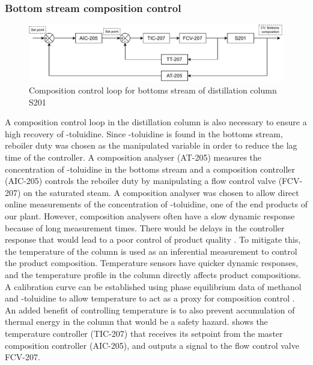 \subsubsection{Bottom stream composition control} %
\begin{figure}
    \centering
    \includegraphics[width=\linewidth]{chapters/4-operation-control/4-Figures/S201-CC.pdf}
    \caption{Composition control loop for bottoms stream of distillation column S201}
    \label{fig:S201-CC}
\end{figure}
A composition control loop in the distillation column is also necessary to ensure a high recovery of \ortho-toluidine. Since \ortho-toluidine is found in the bottoms stream, reboiler duty was chosen as the manipulated variable in order to reduce the lag time of the controller. A composition analyser (AT-205) measures the concentration of \ortho-toluidine in the bottoms stream and a composition controller (AIC-205) controls the reboiler duty by manipulating a flow control valve (FCV-207) on the saturated steam. 
A composition analyser was chosen to allow direct online measurements of the concentration of \ortho-toluidine, one of the end products of our plant. However, composition analysers often have a slow dynamic response because of long measurement times. There would be delays in the controller response that would lead to a poor control of product quality \cite{kister_distillation_1990}. To mitigate this, the temperature of the column is used as an inferential measurement to control the product composition. Temperature sensors have quicker dynamic responses, and the temperature profile in the column directly affects product compositions. A calibration curve can be established using phase equilibrium data of methanol and \ortho-toluidine to allow temperature to act as a proxy for composition control \cite{kister_distillation_1990}. An added benefit of controlling temperature is to also prevent accumulation of thermal energy in the column that would be a safety hazard.  shows the temperature controller (TIC-207) that receives its setpoint from the master composition controller (AIC-205), and outputs a signal to the flow control valve FCV-207.





